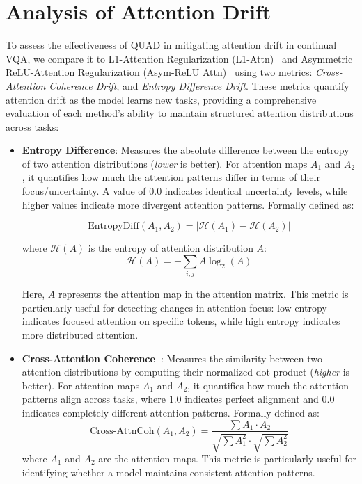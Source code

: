 \section{Analysis of Attention Drift}
\label{sec:analysis_attention_drift}
To assess the effectiveness of QUAD in mitigating attention drift in continual VQA, we compare it to L1-Attention Regularization (L1-Attn)~\citep{dhar2019learning} and Asymmetric ReLU-Attention Regularization (Asym-ReLU Attn)~\citep{pelosin2022towards} using two metrics: \textit{Cross-Attention Coherence Drift}, and \textit{Entropy Difference Drift}. These metrics quantify attention drift as the model learns new tasks, providing a comprehensive evaluation of each method’s ability to maintain structured attention distributions across tasks:
\begin{itemize}
    \item \textbf{Entropy Difference}:
    Measures the absolute difference between the entropy of two attention distributions (\emph{lower} is better). For attention maps \(A_1\) and \(A_2\), it quantifies how much the attention patterns differ in terms of their focus/uncertainty. A value of 0.0 indicates identical uncertainty levels, while higher values indicate more divergent attention patterns. Formally defined as:

    \[
    \text{EntropyDiff}(A_1, A_2) = \left|\mathcal{H}(A_1) - \mathcal{H}(A_2)\right|
    \]

    where \(\mathcal{H}(A)\) is the entropy of attention distribution \(A\):
    \[
    \mathcal{H}(A) = -\sum_{i,j} A \log_2(A)
    \]

    Here, \(A\) represents the attention map in the attention matrix. This metric is particularly useful for detecting changes in attention focus: low entropy indicates focused attention on specific tokens, while high entropy indicates more distributed attention.
    \item \textbf{Cross-Attention Coherence~\citep{amaduzzi2023looking}}:
    Measures the similarity between two attention distributions by computing their normalized dot product (\emph{higher} is better). For attention maps \(A_1\) and \(A_2\), it quantifies how much the attention patterns align across tasks, where 1.0 indicates perfect alignment and 0.0 indicates completely different attention patterns. Formally defined as:
    \[
    \text{Cross-AttnCoh}(A_1, A_2) = \frac{\sum A_1 \cdot A_2}{\sqrt{\sum A_1^2} \cdot \sqrt{\sum A_2^2}}
    \]
    where \(A_1\) and \(A_2\) are the attention maps. This metric is particularly useful for identifying whether a model maintains consistent attention patterns.
    
\end{itemize}
